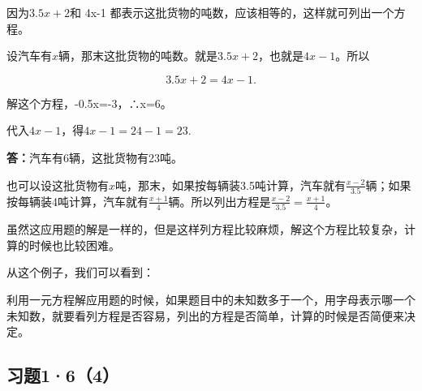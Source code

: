 因为\(3.5x+2\)和 4x-1
都表示这批货物的吨数，应该相等的，这样就可列出一个方程。


设汽车有\(x\)辆，那末这批货物的吨数。就是\(3.5x + 2\)，也就是\(4x - 1\)。所以

\[
3.5 x + 2 = 4 x - 1.
\]

解这个方程，-0.5x=-3，∴x=6。

代入\(4x - 1\)，得\(4x - 1 = 24 - 1 = 23.\)

\textbf{答：}汽车有6辆，这批货物有23吨。


也可以设这批货物有\(x\)吨，那末，如果按每辆装3.5吨计算，汽车就有\(\frac{x - 2}{3.5}\)辆；如果按每辆装4吨计算，汽车就有\(\frac{x + 1}{4}\)辆。所以列出方程是\(\frac{x - 2}{3.5} = \frac{x + 1}{4}\)。

虽然这应用题的解是一样的，但是这样列方程比较麻烦，解这个方程比较复杂，计算的时候也比较困难。

从这个例子，我们可以看到：

利用一元方程解应用题的时候，如果题目中的未知数多于一个，用字母表示哪一个未知数，就要看列方程是否容易，列出的方程是否简单，计算的时候是否简便来决定。

\subsection{习题1·6（4）}

